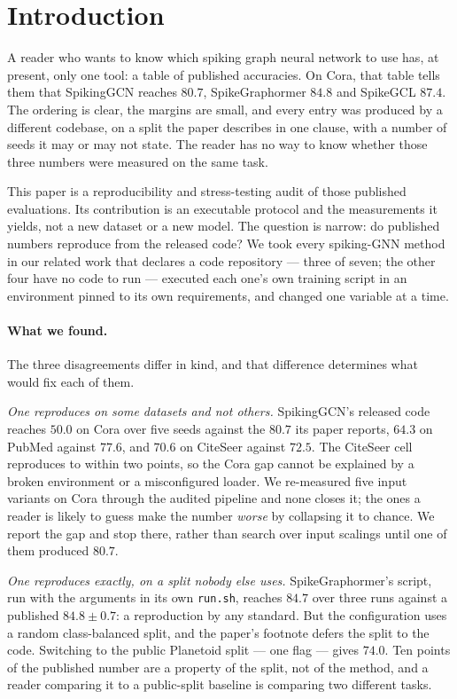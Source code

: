 \documentclass[10pt,twocolumn]{article}
\begin{document}
\section{Introduction}
\label{sec:intro}

A reader who wants to know which spiking graph neural network to use has, at present, only one tool:
a table of published accuracies. On Cora, that table tells them that SpikingGCN reaches $80.7$,
SpikeGraphormer $84.8$ and SpikeGCL $87.4$. The ordering is clear, the margins are small, and every
entry was produced by a different codebase, on a split the paper describes in one clause, with a
number of seeds it may or may not state. The reader has no way to know whether those three numbers
were measured on the same task.

This paper is a reproducibility and stress-testing audit of those published evaluations. Its
contribution is an executable protocol and the measurements it yields, not a new dataset or a new
model. The question is narrow: do published numbers reproduce from the released code? We took every
spiking-GNN method in our related work that declares a code repository --- three of seven; the other
four have no code to run --- executed each one's own training script in an environment pinned to its
own requirements, and changed one variable at a time.

\paragraph{What we found.} The three disagreements differ in kind, and that difference determines
what would fix each of them.

\emph{One reproduces on some datasets and not others.} SpikingGCN's released code reaches $50.0$ on
Cora over five seeds against the $80.7$ its paper reports, $64.3$ on PubMed against $77.6$, and
$70.6$ on CiteSeer against $72.5$. The CiteSeer cell reproduces to within two points, so the Cora
gap cannot be explained by a broken environment or a misconfigured loader. We re-measured five input
variants on Cora through the audited pipeline and none closes it; the ones a reader is likely to
guess make the number \emph{worse} by collapsing it to chance. We report the gap and
stop there, rather than search over input scalings until one of them produced $80.7$.

\emph{One reproduces exactly, on a split nobody else uses.} SpikeGraphormer's script, run with the
arguments in its own \texttt{run.sh}, reaches $84.7$ over three runs against a published
$84.8 \pm 0.7$: a reproduction by any standard. But the configuration uses a random class-balanced
split, and the paper's footnote defers the split to the code. Switching to the public Planetoid split
--- one flag --- gives $74.0$. Ten points of the published number are a property of the split, not of
the method, and a reader comparing it to a public-split baseline is comparing two different tasks.
\end{document}
